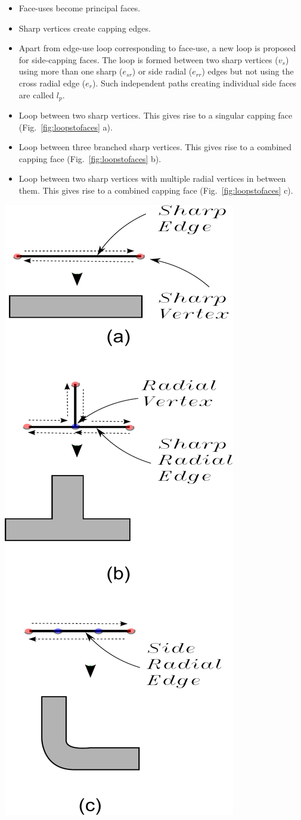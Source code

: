 \begin{itemize}
[noitemsep,topsep=2pt,parsep=2pt,partopsep=2pt,leftmargin=*]
\item Face-uses become principal faces. 
 
\item Sharp vertices create capping edges.

\item Apart from edge-use loop corresponding to face-use, a new loop is proposed for side-capping faces. The loop is formed between two sharp vertices ($v_s$) using  more than one sharp  ($e_{sr}$) or side radial ($e_{rr}$) edges but not using the cross radial edge ($e_r$). Such independent paths creating individual side faces are called $l_p$.
\item Loop between two sharp vertices. This gives rise to a singular capping face  (Fig.~\ref{fig:loopstofaces} a).
\item Loop between three branched sharp vertices. This gives rise to a combined capping face (Fig.~\ref{fig:loopstofaces}  b).
\item Loop between two sharp vertices with multiple radial vertices in between them. This gives rise to a combined capping face (Fig.~\ref{fig:loopstofaces}  c).
\end{itemize}
	

\begin{minipage}[t]{\linewidth}
\centering 
\includegraphics[width=0.45\linewidth]{../Common/images/NonManifoldLoopsToFaces1.pdf}

\label{fig:loopstofaces}
\end{minipage}



